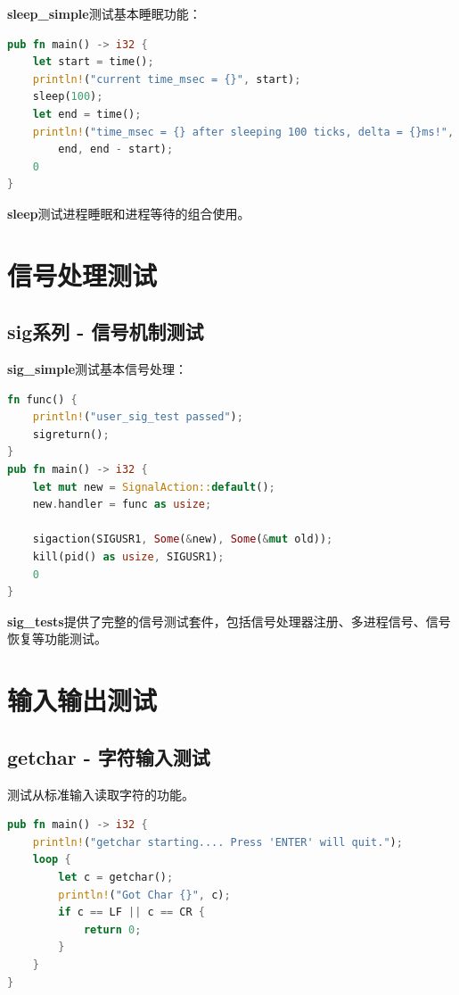 \textbf{sleep\_simple}测试基本睡眠功能：

\begin{lstlisting}[language=Rust]
pub fn main() -> i32 {
    let start = time();
    println!("current time_msec = {}", start);
    sleep(100);
    let end = time();
    println!("time_msec = {} after sleeping 100 ticks, delta = {}ms!",
        end, end - start);
    0
}
\end{lstlisting}

\textbf{sleep}测试进程睡眠和进程等待的组合使用。

\section{信号处理测试}

\subsection{sig系列 - 信号机制测试}

\textbf{sig\_simple}测试基本信号处理：

\begin{lstlisting}[language=Rust]
fn func() {
    println!("user_sig_test passed");
    sigreturn();
}
pub fn main() -> i32 {
    let mut new = SignalAction::default();
    new.handler = func as usize;
    
    sigaction(SIGUSR1, Some(&new), Some(&mut old));
    kill(pid() as usize, SIGUSR1);
    0
}
\end{lstlisting}

\textbf{sig\_tests}提供了完整的信号测试套件，包括信号处理器注册、多进程信号、信号恢复等功能测试。

\section{输入输出测试}

\subsection{getchar - 字符输入测试}

测试从标准输入读取字符的功能。

\begin{lstlisting}[language=Rust]
pub fn main() -> i32 {
    println!("getchar starting.... Press 'ENTER' will quit.");
    loop {
        let c = getchar();
        println!("Got Char {}", c);
        if c == LF || c == CR {
            return 0;
        }
    }
}
\end{lstlisting}

